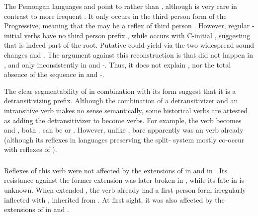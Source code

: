 The Pemongan languages and \kaxui point to  rather than , although \kaxui {} is very rare in contrast to more frequent .
It only occurs in the third person form of the Progressive, meaning that the  may be a reflex of third person .
However, regular -initial \kaxui verbs have no third person prefix , while  occurs with C-initial  , suggesting that  is indeed part of the root.
Putative \PC {} could yield  via the two widespread sound changes  and  \parencite{meira2010origin}.
The argument against this reconstruction is that  did not happen in \PPar, and only inconsistently in \PPP and \mapoyo-\yawarana \parencites[501--502]{meira2010origin}{gildea2010story}.
Thus, it does not explain \kaxui {}, nor the total absence of the sequence  in \panare and \mapoyo-\yawarana.
%
%

The clear segmentability of  in combination with its form suggest that it is a detransitivizing prefix.
Although the combination of a detransitivizer and an intransitive verb makes no sense semantically, some historical  verbs are attested as adding the detransitivizer to become  verbs.
For example, the \PC {} verb   becomes \trio {} \parencite[252]{triomeira1999} and \kalina {} \parencite[429]{courtz2008carib}, both .
\waiwai {} can be  \parencite[30]{waiwaihawkins1998} or  \parencite[204]{hawkins1953waiwai}.
However, unlike , bare   apparently was an  verb already (although its reflexes in languages preserving the split- system mostly co-occur with reflexes of ).

\subsubsection{ }
\label{sec:godown}
Reflexes of this verb were not affected by the extensions of  in \PPek {} and  in \akuriyo {}.
Its resistance against the former extension was later broken in \bakairi, while its fate in \ikpeng is unknown.
When \akuriyo extended , the verb already had a first person form irregularly inflected with , inherited from \PTir.
At first sight, it was also affected by the extensions of  in \carijo {} and \yukpa {}.

